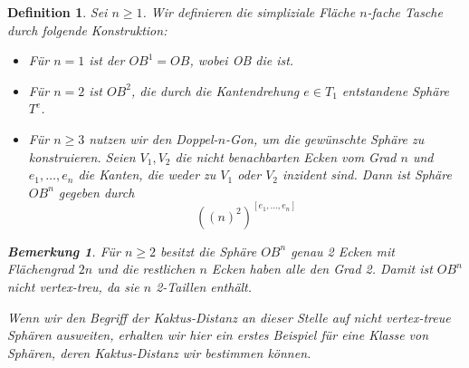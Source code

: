 \documentclass[12pt,titlepage,twoside,cleardoublepage]{article}
\theoremstyle{nummermitklammern}
\newtheorem{definition}[temp]{Definition}
\newtheorem{bemerkung}[temp]{Bemerkung}
\newtheorem{definition}[zahl]{Definition}
\newtheorem{bemerkung}[zahl]{Bemerkung}
\numberwithin{equation}{section}
\begin{document}
\begin{definition}
Sei $n\geq 1$. Wir definieren die simpliziale Fläche $n$-fache Tasche durch folgende Konstruktion:
\begin{itemize}
\item Für $n=1$ ist der $OB^1=OB$, wobei OB die ist.
\item Für $n=2$ ist $OB^2$, die durch die Kantendrehung $e\in T_1$ entstandene Sphäre $T^e$.
\item Für $n\geq 3$ nutzen wir den Doppel-$n$-Gon, um die gewünschte Sphäre zu konstruieren. Seien $V_1,V_2$ die nicht benachbarten Ecken vom Grad $n$ und $e_1,\ldots, e_n$ die Kanten, die weder zu $V_1$ oder $V_2$ inzident sind. Dann ist Sphäre $OB^n$ gegeben durch
\[
{((n)^2)}^{[e_1,\ldots,e_n]}
\]
\end{itemize}
\begin{bemerkung}
Für $n\geq 2$ besitzt die Sphäre $OB^n$ genau 2 Ecken mit Flächengrad $2n$ und die restlichen $n$ Ecken haben alle den Grad 2. Damit ist $OB^n$ nicht vertex-treu, da sie $n$ 2-Taillen enthält.
\end{bemerkung}
Wenn wir den Begriff der Kaktus-Distanz an dieser Stelle auf nicht vertex-treue Sphären ausweiten, erhalten wir hier ein erstes Beispiel für eine Klasse von Sphären, deren Kaktus-Distanz wir bestimmen können. 

\end{definition}
\end{document}
